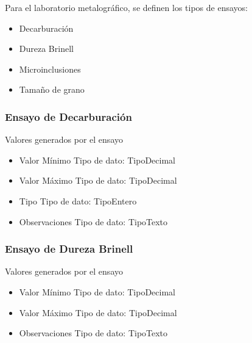 \documentclass{article}
\begin{document}
\par Para el laboratorio metalográfico, se definen los tipos de ensayos:
\begin{itemize}
	\item Decarburación  
	\item Dureza Brinell
	\item Microinclusiones
	\item Tamaño de grano
\end{itemize}

\subsubsection{Ensayo de Decarburación  }

\par Valores generados por el ensayo
\begin{itemize}
	\item{Valor Mínimo} 
		\subitem Tipo de dato: \gls{TipoDecimal}
	\item{Valor Máximo} 
		\subitem Tipo de dato: \gls{TipoDecimal}
	\item{Tipo} 
		\subitem Tipo de dato: \gls{TipoEntero}
	\item{Observaciones}
		\subitem Tipo de dato: \gls{TipoTexto}
\end{itemize}
\subsubsection{Ensayo de Dureza Brinell }

\par Valores generados por el ensayo
\begin{itemize}
	\item{Valor Mínimo} 
		\subitem Tipo de dato: \gls{TipoDecimal}
	\item{Valor Máximo} 
		\subitem Tipo de dato: \gls{TipoDecimal}
	\item{Observaciones}
		\subitem Tipo de dato: \gls{TipoTexto}
\end{itemize}
\end{document}

